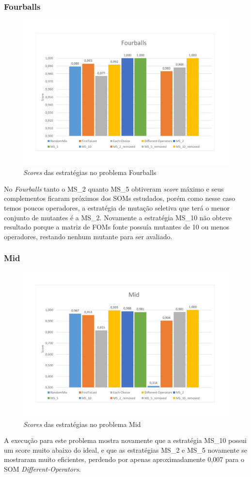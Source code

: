 \subsubsection{Fourballs}
\begin{figure}[H]
\includegraphics[width=1\textwidth]{graficos/problems/fourballs.jpg}
\caption{\textit{Scores} das estratégias no problema Fourballs}
\label{fig:fourballs}
\end{figure}
No \textit{Fourballs} tanto o MS\_2 quanto MS\_5 obtiveram \textit{score} máximo e seus complementos ficaram próximos dos SOMs estudados, porém como nesse caso temos poucos operadores, a estratégia de mutação seletiva que terá o menor conjunto de mutantes é a MS\_2. 
Novamente a estratégia MS\_10 não obteve resultado porque a matriz de FOMs fonte possuía mutantes de 10 ou menos operadores, restando nenhum mutante para ser avaliado.

\subsubsection{Mid}
\begin{figure}[H]
\includegraphics[width=1\textwidth]{graficos/problems/mid.jpg}
\caption{\textit{Scores} das estratégias no problema Mid}
\label{fig:mid}
\end{figure}
A execução para este problema mostra novamente que a estratégia MS\_10 possui um score muito abaixo do ideal, e que as estratégias MS\_2 e MS\_5 novamente se mostraram muito eficientes, perdendo por apenas aproximadamente 0,007 para o SOM \textit{Different-Operators}.
